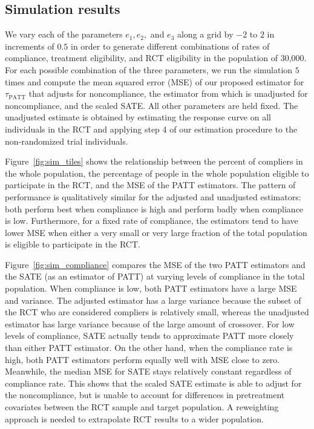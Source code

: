 \documentclass[12pt]{article}
\begin{document}
\subsection{Simulation results}

We vary each of the parameters $e_1, e_2,$ and $e_3$ along a grid by $-2$ to $2$ in increments of $0.5$ in order to generate different combinations of rates of compliance, treatment eligibility, and RCT eligibility in the population of 30,000.  For each possible combination of the three parameters, we run the simulation $5$ times and compute the mean squared error (MSE) of our proposed estimator for $\tau_{\text{PATT}}$ that adjusts for noncompliance, the estimator from \citet{Hartman} which is unadjusted for noncompliance, and the scaled SATE.  All other parameters are held fixed. The unadjusted estimate is obtained by estimating the response curve on all individuals in the RCT and applying step 4 of our estimation procedure to the non-randomized trial individuals. 

Figure~\ref{fig:sim_tiles} shows the relationship between the percent of compliers in the whole population, the percentage of people in the whole population eligible to participate in the RCT, and the MSE of the PATT estimators.  The pattern of performance is qualitatively similar for the adjusted and unadjusted estimators: both perform best when compliance is high and perform badly when compliance is low.  Furthermore, for a fixed rate of compliance, the estimators tend to have lower MSE when either a very small or very large fraction of the total population is eligible to participate in the RCT. 


Figure~\ref{fig:sim_compliance} compares the MSE of the two PATT estimators and the SATE (as an estimator of PATT) at varying levels of compliance in the total population.  When compliance is low, both PATT estimators have a large MSE and variance.  The adjusted estimator has a large variance because the subset of the RCT who are considered compliers is relatively small, whereas the unadjusted estimator has large variance because of the large amount of crossover.  For low levels of compliance, SATE actually tends to approximate PATT more closely than either PATT estimator.  On the other hand, when the compliance rate is high, both PATT estimators perform equally well with MSE close to zero.  Meanwhile, the median MSE for SATE stays relatively constant regardless of compliance rate.  This shows that the scaled SATE estimate is able to adjust for the noncompliance, but is unable to account for differences in pretreatment covariates between the RCT sample and target population. A reweighting approach is needed to extrapolate RCT results to a wider population.
\end{document}
